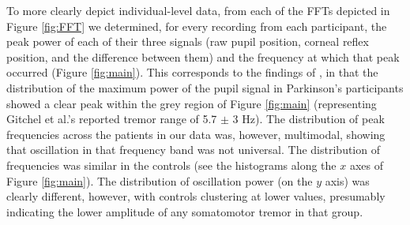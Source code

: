 \documentclass[jou,a4paper]{apa6}
\begin{document}
To more clearly depict individual-level data, from each of the FFTs depicted in Figure \ref{fig:FFT} we determined, for every recording from each participant, the peak power of each of their three signals (raw pupil position, corneal reflex position, and the difference between them) and the frequency at which that peak occurred (Figure \ref{fig:main}). This corresponds to the findings of \citet{Gitchel2012Pervasive-ocula}, in that the distribution of the maximum power of the pupil signal in Parkinson's participants showed a clear peak within the grey region of Figure \ref{fig:main} (representing Gitchel et al.'s reported tremor range of 5.7 $\pm$ 3 Hz). The distribution of peak frequencies across the patients in our data was, however, multimodal, showing that  oscillation in that frequency band was not universal. The distribution of frequencies was similar in the controls (see the histograms along the $x$ axes of Figure \ref{fig:main}). The distribution of oscillation power (on the $y$ axis) was clearly different, however, with controls clustering at lower values, presumably indicating the lower amplitude of any somatomotor tremor in that group.
\end{document}
